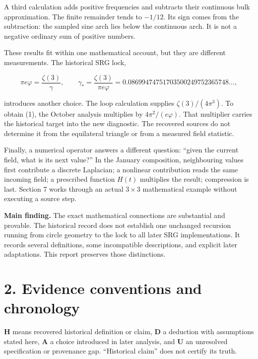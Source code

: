 \documentclass[11pt,a4paper]{article}
\begin{document}
A third calculation adds positive frequencies and subtracts their continuous bulk approximation. The finite remainder tends to \textbf{$-1/12$}. Its sign comes from the subtraction: the sampled sine arch lies below the continuous arch. It is not a negative ordinary sum of positive numbers.


These results fit within one mathematical account, but they are different measurements. The historical SRG lock,


\[
\pi e\varphi=\frac{\zeta(3)}{\gamma},\qquad
\gamma_*=\frac{\zeta(3)}{\pi e\varphi}
=0.08699474751703500249752365748\ldots, \tag{1}
\]

introduces another choice. The loop calculation supplies $\zeta(3)/(4\pi^3)$. To obtain (1), the October analysis multiplies by $4\pi^2/(e\varphi)$. That multiplier carries the historical target into the new diagnostic. The recovered sources do not determine it from the equilateral triangle or from a measured field statistic.


Finally, a numerical operator answers a different question: ``given the current field, what is its next value?'' In the January composition, neighbouring values first contribute a discrete Laplacian; a nonlinear contribution reads the same incoming field; a prescribed function $H(t)$ multiplies the result; compression is last. Section 7 works through an actual $3\times3$ mathematical example without executing a source step.


\textbf{Main finding.} The exact mathematical connections are substantial and provable. The historical record does not establish one unchanged recursion running from circle geometry to the lock to all later SRG implementations. It records several definitions, some incompatible descriptions, and explicit later adaptations. This report preserves those distinctions.


\clearpage
\section*{2. Evidence conventions and chronology}

\textbf{H} means recovered historical definition or claim, \textbf{D} a deduction with assumptions stated here, \textbf{A} a choice introduced in later analysis, and \textbf{U} an unresolved specification or provenance gap. ``Historical claim'' does not certify its truth.
\end{document}
